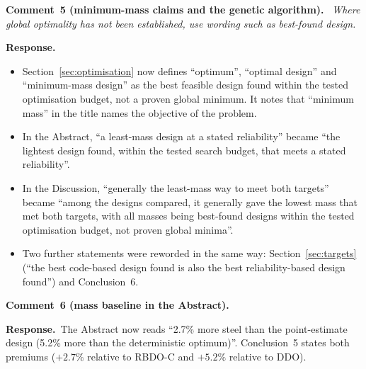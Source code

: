 \documentclass[11pt]{article}
\newenvironment{comment}[1]{\par\medskip\noindent\textbf{Comment~#1.}\ \itshape}{\par}
\newcommand{\resp}{\par\noindent\textbf{Response.}\ }
\begin{document}
\begin{comment}{5 (minimum-mass claims and the genetic algorithm)}
Where global optimality has not been established, use wording such as best-found design.
\end{comment}
\resp
\begin{itemize}[itemsep=0.1em]
\item Section~\ref{sec:optimisation} now defines ``optimum'', ``optimal design'' and ``minimum-mass
design'' as the best feasible design found within the tested optimisation budget, not a proven global
minimum. It notes that ``minimum mass'' in the title names the objective of the problem.
\item In the Abstract, ``a least-mass design at a stated reliability'' became ``the lightest design
found, within the tested search budget, that meets a stated reliability''.
\item In the Discussion, ``generally the least-mass way to meet both targets'' became ``among the
designs compared, it generally gave the lowest mass that met both targets, with all masses being
best-found designs within the tested optimisation budget, not proven global minima''.
\item Two further statements were reworded in the same way: Section~\ref{sec:targets} (``the best
code-based design found is also the best reliability-based design found'') and Conclusion~6.
\end{itemize}

\begin{comment}{6 (mass baseline in the Abstract)}
\end{comment}
\resp The Abstract now reads ``2.7\% more steel than the point-estimate design (5.2\% more than the
deterministic optimum)''. Conclusion~5 states both premiums ($+2.7\%$ relative to RBDO-C and
$+5.2\%$ relative to DDO).
\end{document}
